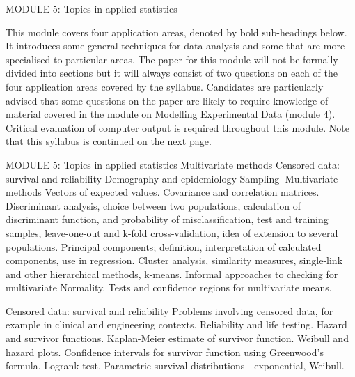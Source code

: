 MODULE 5: Topics in applied statistics

This module covers four application areas, denoted by bold sub-headings below. It introduces some general techniques for data analysis and some that are more specialised to particular areas. The paper for this module will not be formally divided into sections but it will always consist of two questions on each of the four application areas covered by the syllabus. Candidates are particularly advised that some questions on the paper are likely to require knowledge of material covered in the module on Modelling Experimental Data (module 4).
Critical evaluation of computer output is required throughout this module.
Note that this syllabus is continued on the next page.
 

MODULE 5: Topics in applied statistics
Multivariate methods
Censored data: survival and reliability
Demography and epidemiology
Sampling
Multivariate methods
Vectors of expected values. Covariance and correlation matrices.
Discriminant analysis, choice between two populations, calculation of discriminant function, and probability of misclassification, test and training samples, leave-one-out and k-fold cross-validation, idea of extension to several populations.
Principal components; definition, interpretation of calculated components, use in regression.
Cluster analysis, similarity measures, single-link and other hierarchical methods, k-means.
Informal approaches to checking for multivariate Normality. Tests and confidence regions for multivariate means.

Censored data: survival and reliability
Problems involving censored data, for example in clinical and engineering contexts.
Reliability and life testing.
Hazard and survivor functions.
Kaplan-Meier estimate of survivor function.
Weibull and hazard plots.
Confidence intervals for survivor function using Greenwood's formula.
Logrank test.
Parametric survival distributions - exponential, Weibull.

